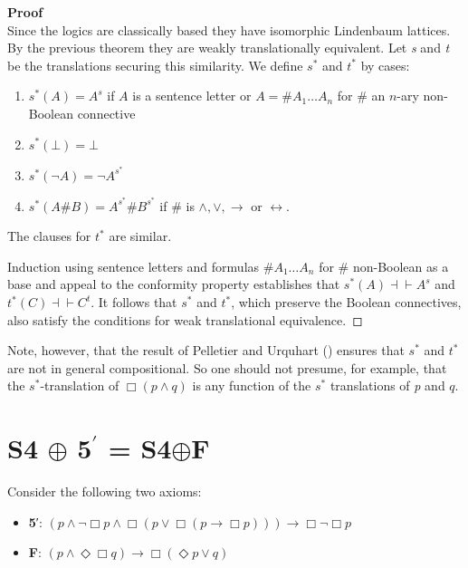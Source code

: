 \documentclass[
  10pt,
  letterpaper,
  DIV=11,
  numbers=noendperiod,
  twoside]{scrartcl}
\providecommand{\tightlist}{%
  \setlength{\itemsep}{0pt}\setlength{\parskip}{0pt}}\usepackage{longtable,booktabs,array}
\begin{document}
\textbf{Proof}\\
Since the logics are classically based they have isomorphic Lindenbaum
lattices. By the previous theorem they are weakly translationally
equivalent. Let \emph{s} and \emph{t} be the translations securing this
similarity. We define \(s^*\) and \(t^*\) by cases:

\begin{enumerate}
\def\labelenumi{\arabic{enumi}.}
\tightlist
\item
  \(s^*(A)=A^s\) if \(A\) is a sentence letter or
  \(A = {\#}A_1{\ldots}A_n\) for \({\#}\) an \(n\)-ary non-Boolean
  connective
\item
  \(s^{*}(\bot)=\bot\)
\item
  \(s^{*}(\neg A)= \neg A^{s^{*}}\)
\item
  \(s^{*}(A{\#}B) = A^{s^{*}}\!{\#} B^{s^{*}}\) if \({\#}\) is
  \(\wedge ,\vee ,\rightarrow\) or \(\leftrightarrow\).
\end{enumerate}

The clauses for \(t^*\) are similar.

Induction using sentence letters and formulas \({\#}A_1{\ldots}A_n\) for
\({\#}\) non-Boolean as a base and appeal to the conformity property
establishes that \(s^*\!(A){\dashv}{\vdash}A^s\) and
\(t^*(C){\dashv}{\vdash}C^t\). It follows that \(s^*\) and \(t^*\),
which preserve the Boolean connectives, also satisfy the conditions for
weak translational equivalence.~◻

Note, however, that the result of Pelletier and Urquhart
() ensures that \(s^*\) and
\(t^*\) are not in general compositional. So one should not presume, for
example, that the \(s^*\)-translation of \(\Box (p\wedge q)\) is any
function of the \(s^*\) translations of \emph{p} and \(q\).

\section{\texorpdfstring{S4 \(\oplus\) 5\(^\prime\) =
S4\(\oplus\)F}{S4 \textbackslash oplus 5\^{}\textbackslash prime = S4\textbackslash oplusF}}\label{s4-oplus-5prime-s4oplusf}

Consider the following two axioms:

\begin{itemize}
\tightlist
\item
  \textbf{5}′:
  \((p \wedge \neg \Box p \wedge \Box (p \vee \Box (p \rightarrow \Box p))) \rightarrow \Box \neg \Box p\)
\item
  \textbf{F}:
  \((p\wedge \Diamond\Box q) \rightarrow \Box (\Diamond p\vee q)\)
\end{itemize}
\end{document}
